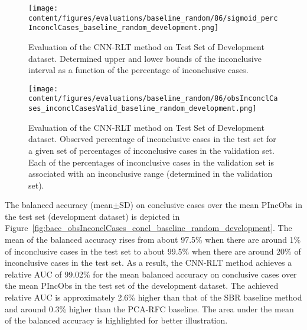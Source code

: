 \begin{figure}[ht]
  \centering
  \texttt{[image: content/figures/evaluations/baseline\_random/86/sigmoid\_percInconclCases\_baseline\_random\_development.png]}
  \caption{Evaluation of the CNN-RLT method on Test Set of Development dataset. 
  Determined upper and lower bounds of the inconclusive interval as a function of the percentage of inconclusive cases.} 
  \label{fig:baseline_random_percInconclCases_development}
\end{figure}


\begin{figure}[ht]
  \centering
  \texttt{[image: content/figures/evaluations/baseline\_random/86/obsInconclCases\_inconclCasesValid\_baseline\_random\_development.png]}
  \caption{Evaluation of the CNN-RLT method on Test Set of Development dataset.
  Observed percentage of inconclusive cases in the test set 
  for a given set of percentages of inconclusive cases in the validation set.
  Each of the percentages of inconclusive cases in the validation set is associated 
  with an inconclusive range (determined in the validation set).} 
  \label{fig:obsInconclCases_inconclCasesValid_baseline_random_development}
\end{figure} 


The balanced accuracy (mean$\pm$SD) on conclusive cases over the mean PIncObs in the test set (development dataset) 
is depicted in Figure~\ref{fig:bacc_obsInconclCases_concl_baseline_random_development}.
The mean of the balanced accuracy rises from about 97.5\% 
when there are around 1\% of inconclusive cases in the test set to about 99.5\% 
when there are around 20\% of inconclusive cases in the test set.
As a result, the CNN-RLT method achieves a relative AUC of 99.02\% for the mean balanced accuracy on conclusive cases
over the mean PIncObs in the test set of the development dataset.
The achieved relative AUC is approximately 2.6\% higher than that of the SBR baseline method 
and around 0.3\% higher than the PCA-RFC baseline.
The area under the mean of the balanced accuracy is highlighted for better illustration.


